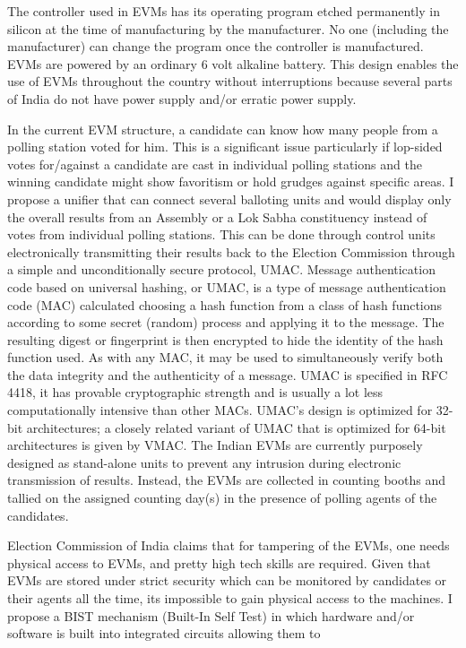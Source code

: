 \documentclass{article}
\begin{document}
The controller used in EVMs has its operating program etched permanently in silicon at the time of manufacturing by the manufacturer. No one (including the manufacturer) can change the program once the controller is manufactured. EVMs are powered by an ordinary 6 volt alkaline battery. This design enables the use of EVMs throughout the country without interruptions because several parts of India do not have power supply and/or erratic power supply. \par
In the current EVM structure, a candidate can know how many people from a polling station voted for him. This is a significant issue particularly if lop-sided votes for/against a candidate are cast in individual polling stations and the winning candidate might show favoritism or hold grudges against specific areas. I propose a unifier that can connect several balloting units and would display only the overall results from an Assembly or a Lok Sabha constituency instead of votes from individual polling stations. This can be done through control units electronically transmitting their results back to the Election Commission through a simple and unconditionally secure protocol, UMAC. Message authentication code based on universal hashing, or UMAC, is a type of message authentication code (MAC) calculated choosing a hash function from a class of hash functions according to some secret (random) process and applying it to the message. The resulting digest or fingerprint is then encrypted to hide the identity of the hash function used. As with any MAC, it may be used to simultaneously verify both the data integrity and the authenticity of a message. UMAC is specified in RFC 4418, it has provable cryptographic strength and is usually a lot less computationally intensive than other MACs. UMAC's design is optimized for 32-bit architectures; a closely related variant of UMAC that is optimized for 64-bit architectures is given by VMAC. The Indian EVMs are currently purposely designed as stand-alone units to prevent any intrusion during electronic transmission of results. Instead, the EVMs are collected in counting booths and tallied on the assigned counting day(s) in the presence of polling agents of the candidates. \par
Election Commission of India claims that for tampering of the EVMs, one needs physical access to EVMs, and pretty high tech skills are required. Given that EVMs are stored under strict security which can be monitored by candidates or their agents all the time, its impossible to gain physical access to the machines. I propose a BIST mechanism (Built-In Self Test) in which hardware and/or software is built into integrated circuits allowing them to
\end{document}
